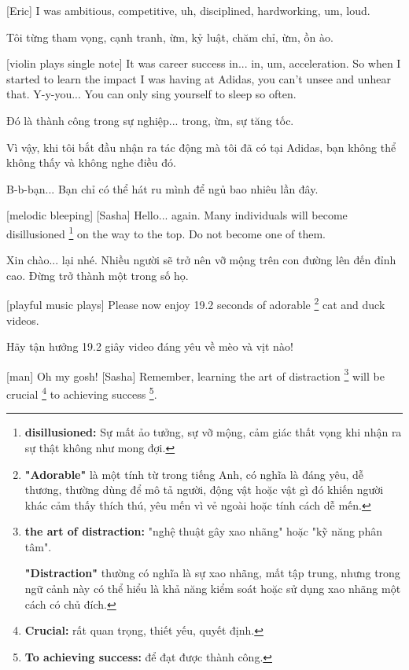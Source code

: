 \documentclass[a4paper]{article}
\begin{document}
	[Eric] I was ambitious,	competitive, uh, disciplined, hardworking, um, loud.
	
	\begin{vietnamese-v2}
		[Eric] Tôi từng tham vọng, cạnh tranh, ừm, kỷ luật, chăm chỉ, ừm, ồn ào.
	\end{vietnamese-v2}

	[violin plays single note]
	It was career success in... in, um, acceleration. So when I started to learn the impact I was having at Adidas, you can't unsee and unhear that.
	Y-y-you... You can only sing yourself to sleep so often.
	
	\begin{vietnamese-v2}
		
		Đó là thành công trong sự nghiệp... trong, ừm, sự tăng tốc. 
		
		Vì vậy, khi tôi bắt đầu nhận ra tác động mà tôi đã có tại Adidas, bạn không thể không thấy và không nghe điều đó.
		
		B-b-bạn... Bạn chỉ có thể hát ru mình để ngủ bao nhiêu lần đây.
	\end{vietnamese-v2}
	
	\pagebreak
	
	[melodic bleeping]
	[Sasha] Hello... again.
	Many individuals will become disillusioned \footnote{
		\textbf{disillusioned:} Sự mất ảo tưởng, sự vỡ mộng, cảm giác thất vọng khi nhận ra sự thật không như mong đợi.
	
	} on the way to the top. Do not become one of them.
	
	\begin{vietnamese-v2}
		 Xin chào... lại nhé. 
		Nhiều người sẽ trở nên vỡ mộng trên con đường lên đến đỉnh cao. Đừng trở thành một trong số họ.
	\end{vietnamese-v2}

	[playful music plays]
	Please now enjoy 19.2 seconds of adorable \footnote{
		\textbf{"Adorable"} là một tính từ trong tiếng Anh, có nghĩa là đáng yêu, dễ thương, thường dùng để mô tả người, động vật hoặc vật gì đó khiến người khác cảm thấy thích thú, yêu mến vì vẻ ngoài hoặc tính cách dễ mến.
	
	} cat and duck videos.
	
	\begin{vietnamese-v2}
		Hãy tận hưởng 19.2 giây video đáng yêu về mèo và vịt nào!
	\end{vietnamese-v2}
	
	[man] Oh my gosh!
	[Sasha] Remember, learning the art of distraction \footnote{
		\textbf{the art of distraction:} "nghệ thuật gây xao nhãng" hoặc "kỹ năng phân tâm".
		
		\textbf{"Distraction"} thường có nghĩa là sự xao nhãng, mất tập trung, nhưng trong ngữ cảnh này có thể hiểu là khả năng kiểm soát hoặc sử dụng xao nhãng một cách có chủ đích.
	
	} will be crucial \footnote{
		\textbf{Crucial:} rất quan trọng, thiết yếu, quyết định.
	
	} to achieving success \footnote{
		\textbf{To achieving success:} để đạt được thành công.
	
	}.
	
\end{document}
